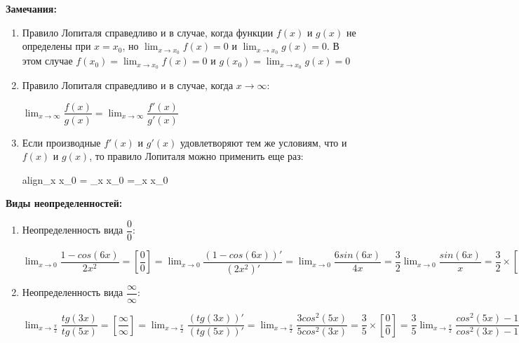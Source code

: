 \documentclass[oneside]{book}
\newcommand{\boxedeq}[2]{\begin{empheq}[box={\fboxsep=6pt\fbox}]{align}\label{#1}#2\end{empheq}}
\begin{document}
\begin{enumerate}
\begin{itemize}
\textbf{Замечания:}
\begin{enumerate}

	\item Правило Лопиталя справедливо и в случае, когда функции $f(x)$ и $g(x)$ не определены при  $x=x_{0}$, но $\lim_{x \to x_{0}} f(x) = 0$ и $\lim_{x \to x_{0}} g(x) = 0$. В этом случае $f(x_{0})=\lim_{x \to x_{0}} f(x) = 0$ и $g(x_{0})=\lim_{x \to x_{0}} g(x) = 0$
	\item Правило Лопиталя справедливо и в случае, когда ${x \to \infty}$: \begin{center}
		$\lim_{x \to \infty} \dfrac{f(x)}{g(x)} = \lim_{x \to \infty} \dfrac{f'(x)}{g'(x)}$
	\end{center}
	\item Если производные $f'(x)$ и $g'(x)$ удовлетворяют тем же условиям, что и $f(x)$ и $g(x)$, то правило Лопиталя можно применить еще раз:\boxedeq{eq:*}{\lim_{x{\large } \to x_{0}}  = \lim_{x \to x_{0}} \dfrac{f'(x)}{g'(x)}=\lim_{x \to x_{0}} \dfrac{f''(x)}{g''(x)}}

\end{enumerate}

\textbf{Виды неопределенностей:}
\begin{enumerate}
	\item Неопределенность вида $\dfrac{0}{0}$:

	$\lim_{x \to 0} \dfrac{1-cos(6x)}{2x^{2}}=
	[\dfrac{0}{0}]=
	\lim_{x \to 0} \dfrac{(1-cos(6x))'}{(2x^{2})'}=
	\lim_{x \to 0} \dfrac{6sin(6x)}{4x}=
	\dfrac{3}{2}\lim_{x \to 0} \dfrac{sin(6x)}{x}=
	\dfrac{3}{2}\times[\dfrac{0}{0}]=
	\dfrac{3}{2}\lim_{x \to 0} \dfrac{(sin(6x))'}{(x)'}=
	\dfrac{3}{2}\lim_{x \to 0} \dfrac{6cos(6x)}{1}=
	\dfrac{3}{2}\times 6=9$

	\item Неопределенность вида $\dfrac{\infty}{\infty}$:

	$\lim_{x \to \frac{\pi}{2}} \dfrac{tg(3x)}{tg(5x)}=
	[\dfrac{\infty}{\infty}]=
	\lim_{x \to \frac{\pi}{2}} \dfrac{(tg(3x))'}{(tg(5x))'}=
	\lim_{x \to \frac{\pi}{2}}\dfrac{3cos^{2}(5x)}{5cos^{2}(3x)}=
	\dfrac{3}{5}\times[\dfrac{0}{0}]=
	\dfrac{3}{5}\lim_{x \to \frac{\pi}{2}}\dfrac{cos^{2}(5x)-1+1}{cos^{2}(3x)-1+1}=
	\dfrac{3}{5}\lim_{x \to\frac{\pi}{2}}\dfrac{cos(10x)+1}{cos(6x)+1}=
	\dfrac{3}{5}\times[\dfrac{0}{0}]=
	\dfrac{3}{5}\lim_{x \to \frac{\pi}{2}} \dfrac{(cos(10x)+1)'}{(cos(6x)+1)'}=
	\dfrac{3}{5}\lim_{x \to \frac{\pi}{2}} \dfrac{10sin(10x)}{6sin(6x)}=
	\lim_{x \to \frac{\pi}{2}} \dfrac{sin(10x)}{sin(6x)}=
	[\dfrac{0}{0}]=
	\lim_{x \to \frac{\pi}{2}} \dfrac{(sin(10x))'}{(sin(6x))'}=
	\lim_{x \to \frac{\pi}{2}} \dfrac{10cos(10x)}{6cos(6x)}=
	\dfrac{5}{3}$


\end{enumerate}
\end{itemize}
\end{enumerate}
\end{document}

